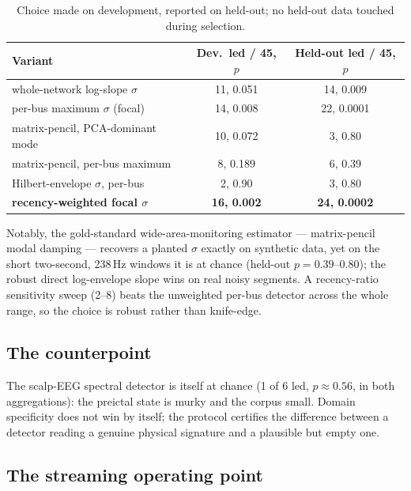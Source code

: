 \documentclass[aip,cha,preprint,amsmath,amssymb]{revtex4-2}
\begin{document}
\begin{table}[h!]
\centering
\scriptsize
\setlength{\tabcolsep}{3pt}
\begin{tabular}{lcc}
\toprule
Variant & Dev.\ led / 45, $p$ & Held-out led / 45, $p$ \\
\midrule
whole-network log-slope $\sigma$ & 11, 0.051 & 14, 0.009 \\
per-bus maximum $\sigma$ (focal) & 14, 0.008 & 22, 0.0001 \\
matrix-pencil, PCA-dominant mode & 10, 0.072 & 3, 0.80 \\
matrix-pencil, per-bus maximum & 8, 0.189 & 6, 0.39 \\
Hilbert-envelope $\sigma$, per-bus & 2, 0.90 & 3, 0.80 \\
\textbf{recency-weighted focal $\sigma$} & \textbf{16, 0.002} & \textbf{24, 0.0002} \\
\bottomrule
\end{tabular}
\caption{Choice made on development, reported on held-out; no held-out
data touched during selection.}
\label{tab:variants}
\end{table}

Notably, the gold-standard wide-area-monitoring estimator ---
matrix-pencil modal damping --- recovers a planted $\sigma$ exactly on
synthetic data, yet on the short two-second, 238\,Hz windows it is at
chance (held-out $p = 0.39$--$0.80$); the robust direct log-envelope
slope wins on real noisy segments. A recency-ratio sensitivity sweep
(2--8) beats the unweighted per-bus detector across the whole range, so
the choice is robust rather than knife-edge.

\subsection{The counterpoint}

The scalp-EEG spectral detector is itself at chance (1 of 6 led,
$p \approx 0.56$, in both aggregations): the preictal state is murky
and the corpus small. Domain specificity does not win by itself; the
protocol certifies the difference between a detector reading a genuine
physical signature and a plausible but empty one.

\subsection{The streaming operating point}\label{sec:stream}
\end{document}
